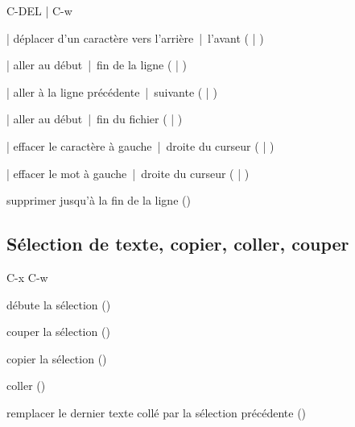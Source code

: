 \begin{ttscript}{C-DEL | C-w}
\item[\code{C-b} | \code{C-f}] déplacer d'un caractère vers
  l'arrière~|~l'avant \newline
  ( | )
\item[\code{C-a} | \code{C-e}] aller au début~|~fin de la ligne \newline
  ( | )
\item[\code{C-p} | \code{C-n}] aller à la ligne précédente~|~suivante \newline
  ( | )
\item[\code{M-<} | \code{M->}] aller au début~|~fin du fichier \newline
  ( | )
  \\
\item[\code{DEL} | \code{C-d}] effacer le caractère à
  gauche~|~droite du curseur  \newline
  ( | )
\item[\code{M-DEL} | \code{M-d}] effacer le mot à gauche~|~droite
  du curseur  \newline
  ( | )
\item[\code{C-k}] supprimer jusqu'à la fin de la ligne ()
\end{ttscript}



\subsection{Sélection de texte, copier, coller, couper}
\label{sec:emacs+ess:commandes:selection}

\begin{ttscript}{C-x C-w}
\item[\code{C-SPC}] débute la sélection ()
\item[\code{C-w}] couper la sélection ()
\item[\code{M-w}] copier la sélection ()
\item[\code{C-y}] coller ()
\item[\code{M-y}] remplacer le dernier texte collé par la
  sélection précédente \newline
  ()
\end{ttscript}

